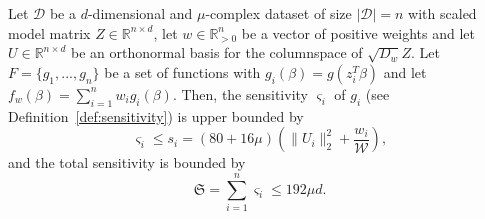 \begin{lemma}
    \label{lemma:sensitivity-bounds}
    Let $\mathcal{D}$ be a $d$-dimensional and $\mu$-complex dataset of size
    $|\mathcal{D}|=n$ with scaled model matrix
    $Z \in \mathbb{R}^{n \times d}$, let $w \in \mathbb{R}^n_{>0}$
    be a vector of positive weights and let
    $U \in \mathbb{R}^{n \times d }$ be an orthonormal basis for
    the columnspace of $\sqrt{D_w}Z$.
    Let $F = \{g_1, ..., g_n\}$ be a set of functions with
    $g_i(\beta) = g(z_i^T \beta)$ and let
    $f_w(\beta) = \sum_{i=1}^n w_ig_i(\beta)$.
    Then, the sensitivity $\varsigma_i$ of $g_i$
    (see Definition~\ref{def:sensitivity}) is upper bounded by
    \begin{equation*}
        \varsigma_i \leq s_i
        = (80 + 16\mu)(\lVert U_i \rVert_2^2 + \frac{w_i}{\mathcal{W}}),
    \end{equation*}
    and the total sensitivity is bounded by
    \begin{equation*}
        \mathfrak{S} = \sum_{i=1}^n \varsigma_i \leq 192 \mu d.
    \end{equation*}
\end{lemma}
